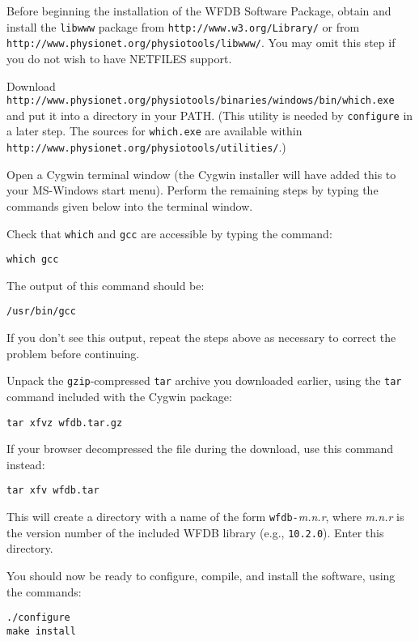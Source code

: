 \documentclass[twoside]{article}
\begin{document}
Before beginning the installation of the WFDB Software Package, obtain and
install the {\tt libwww} package from {\tt http://www.w3.org/Library/} or
from {\tt http://\-www.physio\-net.org/physio\-tools/libwww/}.  You may
omit this step if you do not wish to have NETFILES support.

Download
{\tt http://www.physio\-net.org/physio\-tools/binaries/win\-dows/bin/which.exe}
and put it into a directory in your PATH.  (This utility is needed by
{\tt configure} in a later step.  The sources for {\tt which.exe} are available
within {\tt http://www.physio\-net.org/physio\-tools/util\-ities/}.)

Open a Cygwin terminal window (the Cygwin installer will have added this to
your MS-Windows start menu).  Perform the remaining steps by typing the
commands given below into the terminal window.

Check that {\tt which} and {\tt gcc} are accessible by typing the command:

\begin{verbatim}
which gcc
\end{verbatim}

The output of this command should be:

\begin{verbatim}
/usr/bin/gcc
\end{verbatim}

If you don't see this output, repeat the steps above as necessary to correct
the problem before continuing.

Unpack the {\tt gzip}-compressed {\tt tar} archive you downloaded earlier,
using the {\tt tar} command included with the Cygwin package:

\begin{verbatim}
tar xfvz wfdb.tar.gz
\end{verbatim}

If your browser decompressed the file during the download, use this command
instead:

\begin{verbatim}
tar xfv wfdb.tar
\end{verbatim}

This will create a directory with a name of the form {\tt wfdb-}{\em m.n.r},
where {\em m.n.r} is the version number of the included WFDB library (e.g.,
{\tt 10.2.0}).  Enter this directory.

You should now be ready to configure, compile, and install the software, using
the commands:

\begin{verbatim}
./configure
make install
\end{verbatim}
\end{document}
